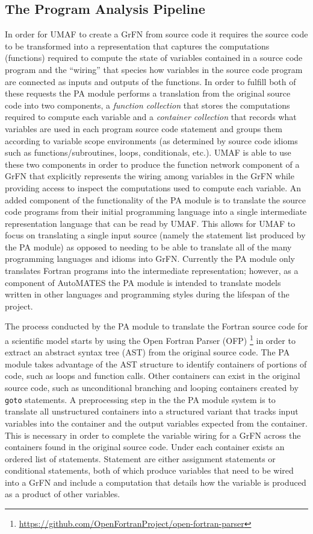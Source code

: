 \subsection{The Program Analysis Pipeline\label{sec:pa_overview}}
In order for UMAF to create a GrFN from source code it requires the source code to be transformed into a representation that captures the computations (functions) required to compute the state of variables contained in a source code program and the ``wiring'' that species how variables in the source code program are connected as inputs and outputs of the functions.
In order to fulfill both of these requests the PA module performs a translation from the original source code into two components, a \textit{function collection} that stores the computations required to compute each variable and a \textit{container collection} that records what variables are used in each program source code statement and groups them according to variable scope environments (as determined by source code idioms such as functions/subroutines, loops, conditionals, etc.).
UMAF is able to use these two components in order to produce the function network component of a GrFN that explicitly represents the wiring among variables in the GrFN while providing access to inspect the computations used to compute each variable.
An added component of the functionality of the PA module is to translate the source code programs from their initial programming language into a single intermediate representation language that can be read by UMAF.
This allows for UMAF to focus on translating a single input source (namely the statement list produced by the PA module) as opposed to needing to be able to translate all of the many programming languages and idioms into GrFN.
Currently the PA module only translates Fortran programs into the intermediate representation; however, as a component of AutoMATES the PA module is intended to translate models written in other languages and programming styles during the lifespan of the project.

The process conducted by the PA module to translate the Fortran source code for a scientific model starts by using the Open Fortran Parser (OFP) \footnote{\url{https://github.com/OpenFortranProject/open-fortran-parser}} in order to extract an abstract syntax tree (AST) \citep{aho1986dragonBook} from the original source code.
The PA module takes advantage of the AST structure to identify containers of portions of code, such as loops and function calls.
Other containers can exist in the original source code, such as unconditional branching and looping containers created by \texttt{goto} statements.
A preprocessing step in the the PA module system is to translate all unstructured containers into a structured variant that tracks input variables into the container and the output variables expected from the container.
This is necessary in order to complete the variable wiring for a GrFN across the containers found in the original source code.
Under each container exists an ordered list of statements.
Statement are either assignment statements or conditional statements, both of which produce variables that need to be wired into a GrFN and include a computation that details how the variable is produced as a product of other variables.

